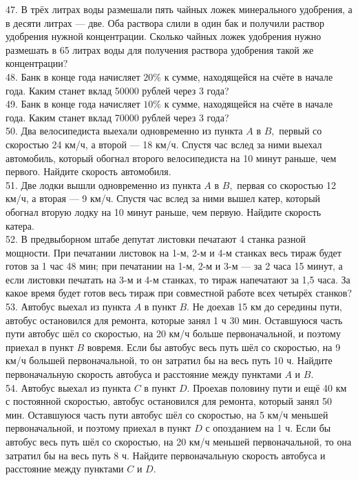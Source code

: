 \documentclass[12pt]{article}
\begin{document}
47. В трёх литрах воды размешали пять чайных ложек минерального удобрения, а в десяти литрах --- две. Оба раствора слили в один бак и получили раствор удобрения нужной концентрации. Сколько чайных ложек удобрения нужно размешать в 65 литрах воды для получения раствора удобрения такой же концентрации?\\
48. Банк в конце года начисляет $20\%$ к сумме, находящейся на счёте в начале года. Каким станет вклад 50000 рублей через 3 года?\\
49. Банк в конце года начисляет $10\%$ к сумме, находящейся на счёте в начале года. Каким станет вклад 70000 рублей через 3 года?\\
50. Два велосипедиста выехали одновременно из пункта $A$ в $B,$ первый со скоростью 24 км/ч, а второй --- 18 км/ч. Спустя час вслед за ними выехал автомобиль, который обогнал второго велосипедиста на 10 минут раньше, чем первого. Найдите скорость автомобиля.\\
51. Две лодки вышли одновременно из пункта $A$ в $B,$ первая со скоростью 12 км/ч, а вторая --- 9 км/ч. Спустя час вслед за ними вышел катер, который обогнал вторую лодку на 10 минут раньше, чем первую. Найдите скорость катера.\\
52. В предвыборном штабе депутат листовки печатают 4 станка разной мощности. При печатании листовок на 1-м, 2-м и 4-м станках весь тираж будет готов за 1 час 48 мин; при печатании на 1-м, 2-м и 3-м --- за 2 часа 15 минут, а если листовки печатать на 3-м и 4-м станках, то тираж напечатают за 1,5 часа. За какое время будет готов весь тираж при совместной работе всех четырёх станков?\\
53. Автобус выехал из пункта $A$ в пункт $B.$ Не доехав 15 км до середины пути, автобус остановился для ремонта, которые занял 1 ч 30 мин. Оставшуюся часть пути автобус шёл со скоростью, на 20 км/ч больше первоначальной, и поэтому приехал в пункт $B$ вовремя. Если бы автобус весь путь шёл со скоростью, на 9 км/ч большей первоначальной, то он затратил бы на весь путь 10 ч. Найдите первоначальную скорость автобуса и расстояние между пунктами $A$ и $B.$\\
54. Автобус выехал из пункта $C$ в пункт $D.$ Проехав половину пути и ещё 40 км с постоянной скоростью, автобус остановился для ремонта, который занял 50 мин.  Оставшуюся часть пути автобус шёл со скоростью, на 5 км/ч меньшей первоначальной, и поэтому приехал в пункт $D$ с опозданием на 1 ч. Если бы автобус весь путь шёл со скоростью, на 20 км/ч меньшей первоначальной, то она затратил бы на весь путь 8 ч. Найдите первоначальную скорость автобуса и расстояние между пунктами $C$ и $D.$\\
\end{document}

